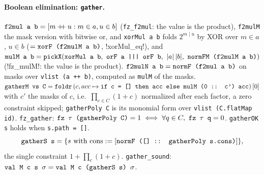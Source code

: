 \paragraph{Boolean elimination: \textnormal{\texttt{gather}}.} $\textnormal{\texttt{f2mul a b}} = [m\mathbin{+\!\!+}u: m\in a, u\in b]$
(\textnormal{\texttt{fz\_\allowbreak{}f2mul}}: the value is the product), \textnormal{\texttt{f2mulM}} the mask version with bitwise or, and
\textnormal{\texttt{xorMul a b}} folds $2^{m\mathbin{|}u}$ by XOR over $m\in a$, $u\in b$
($=\textnormal{\texttt{xorF (f2mulM a b)}}$, \lean!xorMul_eq!), and
$\textnormal{\texttt{mulM a b}} = \textnormal{\texttt{pickX}}(\textnormal{\texttt{xorMul a b}},\ \textnormal{\texttt{orF a ||| orF b}},\ |a|\,|b|,\ \textnormal{\texttt{normFM (f2mulM a b)}})$
(\lean!fz_mulM!: the value is the product).
$\textnormal{\texttt{f2mulN a b}} = \textnormal{\texttt{normF (\allowbreak{}f2mul a b)}}$ on masks over \textnormal{\texttt{vlist (\allowbreak{}a ++ b)}},
computed as \textnormal{\texttt{mulM}} of the masks.
$\textnormal{\texttt{gatherM vs C}} = \textnormal{\texttt{foldr}}\,(c,acc\mapsto\textnormal{\texttt{if c = [] then acc else mulM (\allowbreak{}0 :: c') acc}})\,[0]$ with
$c'$ the masks of $c$, i.e.\ $\prod_{c\in C}(1+c)$ normalized after each factor, a zero constraint
skipped;
\textnormal{\texttt{gatherPoly C}} is its monomial form over \textnormal{\texttt{vlist (\allowbreak{}C.\allowbreak{}flatMap id)}}.
\textnormal{\texttt{fz\_\allowbreak{}gather}}: $\textnormal{\texttt{fz \ensuremath{\tau} (\allowbreak{}gatherPoly C)}} = 1\iff\forall q\in C,\ \textnormal{\texttt{fz \ensuremath{\tau} q}} = 0$.
\textnormal{\texttt{gatherOK s}} holds when \textnormal{\texttt{s.\allowbreak{}path = []}}.
\[
\textnormal{\texttt{gatherS s}} = \{s \text{ with cons} := [\textnormal{\texttt{normF (\allowbreak{}[] :: gatherPoly s.\allowbreak{}cons)}}]\},
\]
the single constraint $1+\prod_{c}(1+c)$. \textnormal{\texttt{gather\_\allowbreak{}sound}}:
$\textnormal{\texttt{val M c s \ensuremath{\sigma}}} = \textnormal{\texttt{val M c (\allowbreak{}gatherS s) \ensuremath{\sigma}}}$.

